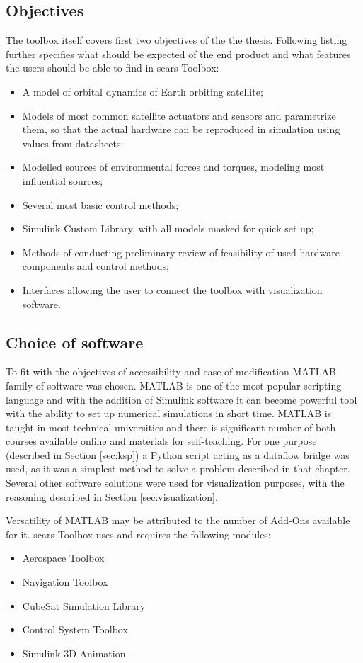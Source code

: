 \subsection{Objectives}\label{toolbox:objectives}
    The toolbox itself covers first two objectives of the the thesis. Following listing further specifies what should be expected of the end product and what features the users should be able to find in \ac{scars} Toolbox: 
    \begin{itemize}
        \item A model of orbital dynamics of Earth orbiting satellite;
        \item Models of most common satellite actuators and sensors and parametrize them, so that the actual hardware can be reproduced in simulation using values from datasheets;
        \item Modelled sources of environmental forces and torques, modeling most influential sources;
        \item Several most basic control methods;
        \item Simulink Custom Library, with all models masked for quick set up;
        \item Methods of conducting preliminary review of feasibility of used hardware components and control methods;
        \item Interfaces allowing the user to connect the toolbox with visualization software.
    \end{itemize}

\subsection{Choice of software}\label{toolbox:software}
    To fit with the objectives of accessibility and ease of modification MATLAB family of software was chosen. MATLAB is one of the most popular scripting language and with the addition of Simulink software it can become powerful tool with the ability to set up numerical simulations in short time. MATLAB is taught in most technical universities and there is significant number of both courses available online and materials for self-teaching. For one purpose (described in Section \ref{sec:ksp}) a Python script acting as a dataflow bridge was used, as it was a simplest method to solve a problem described in that chapter. Several other software solutions were used for visualization purposes, with the reasoning described in Section \ref{sec:visualization}.

    Versatility of MATLAB may be attributed to the number of Add-Ons available for it. \ac{scars} Toolbox uses and requires the following modules:
    \begin{itemize}
        \item Aerospace Toolbox
        \item Navigation Toolbox
        \item CubeSat Simulation Library
        \item Control System Toolbox
        \item Simulink 3D Animation
    \end{itemize}
    
